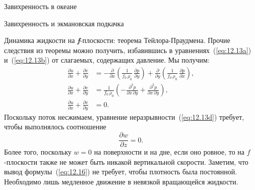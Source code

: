 \begin{chapter}{Завихренность в океане}
\begin{section}{Завихренность и экмановская подкачка}
\begin{paragraph}{Динамика жидкости на \textbf{\textit{f}}-плоскости: 
теорема Тейлора-Праудмена.}
Прочие следствия из теоремы можно получить, избавившись в 
уравнениях~(\ref{eq:12.13a}) и~(\ref{eq:12.13b}) от слагаемых,
содержащих давление. Мы получим:
\begin{subequations}
\begin{align}
\frac{\partial{u}}{\partial{x}} + \frac{\partial{v}}{\partial{y}} 
  &= -\frac{\partial }{\partial{x}} \left(\frac{1}{f_{0}\,\rho_{0}}\,
       \frac{\partial{p}}{\partial{y}} \right) 
     + \frac{\partial }{\partial{y}} \left(\frac{1}{f_{0}\,\rho_{0}}\,
       \frac{\partial{p}}{\partial{x}} \right), \label{eq:12.15a}\\
\frac{\partial{u}}{\partial{x}} + \frac{\partial{v}}{\partial{y}} 
  &= \frac{1}{f_{0}\,\rho_{0}} 
       \left( -\frac{\partial ^2 p}{\partial{x}\,\partial{y}} 
              + \frac{\partial ^2 p}{\partial{x}\,\partial{y}} \right),  \label{eq:12.15b}\\
\frac{\partial{u}}{\partial{x}} + \frac{\partial{v}}{\partial{y}} 
  &= 0.\label{eq:12.15c}
\end{align}
\end{subequations}
Поскольку поток несжимаем, уравнение неразрывности~(\ref{eq:12.13d}) требует,
чтобы выполнялось соотношение
\begin{equation}\label{eq:12.16}
 \frac{\partial{w}}{\partial{z}} = 0.
\end{equation}
Более того, поскольку $w = 0$ на поверхности и на дне, если оно ровное, 
то на $f$-плоскости также не может 
быть никакой вертикальной скорости. Заметим, что вывод 
формулы~(\ref{eq:12.16}) не требует, чтобы плотность была постоянной. 
Необходимо лишь медленное движение в невязкой вращающейся жидкости.
%

\end{paragraph}
\end{section}
\end{chapter}

